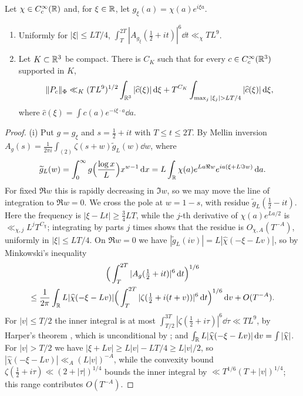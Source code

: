 \documentclass[11pt,colorlinks]{charlie}
\begin{document}
\begin{lemma}\label{lem:sixth}
Let $\chi\in C_c^\infty(\mathbb{R})$ and, for $\xi\in\mathbb{R}$, let $g_\xi(a)=\chi(a)e^{i\xi a}$.
\begin{enumerate}[label=(\roman*)]
\item Uniformly for $|\xi|\le LT/4$, $\int_{T}^{2T}|A_{g_\xi}(\frac12+it)|^6\dd t\ll_\chi TL^9$.
\item Let $K\subset\mathbb{R}^3$ be compact. There is $C_K$ such that for every $c\in C_c^\infty(\mathbb{R}^3)$ supported in $K$,
\[
 \|P_c\|_\Phi\ll_K(TL^9)^{1/2}\int_{\R^3}|\widehat c(\xi)|\dd\xi+T^{C_K}\int_{\max_j|\xi_j|>LT/4}|\widehat c(\xi)|\dd\xi ,
\]
where $\widehat c(\xi)=\int c(a)e^{-i\xi\cdot a}\dd a$.
\end{enumerate}
\end{lemma}
\begin{proof}
(i) Put $g=g_\xi$ and $s=\frac12+it$ with $T\le t\le2T$. By Mellin inversion $A_g(s)=\frac1{2\pi i}\int_{(2)}\zeta(s+w)\widetilde g_L(w)\dd w$, where
\[
 \widetilde g_L(w)=\int_0^\infty g\Big(\frac{\log x}L\Big)x^{w-1}\,\mathrm{d} x=L\int_{\mathbb{R}}\chi(a)e^{La\Re w}e^{ia(\xi+L\Im w)}\,\mathrm{d} a .
\]
For fixed $\Re w$ this is rapidly decreasing in $\Im w$, so we may move the line of integration to $\Re w=0$. We cross the pole at $w=1-s$, with residue $\widetilde g_L(\frac12-it)$. Here the frequency is $|\xi-Lt|\ge\frac34LT$, while the $j$-th derivative of $\chi(a)e^{La/2}$ is $\ll_{\chi,j}L^jT^{C_\chi}$; integrating by parts $j$ times shows that the residue is $O_{\chi,A}(T^{-A})$, uniformly in $|\xi|\le LT/4$. On $\Re w=0$ we have $|\widetilde g_L(iv)|=L|\widehat\chi(-\xi-Lv)|$, so by Minkowski's inequality
\begin{multline*}
 \Big(\int_T^{2T}|A_g(\tfrac12+it)|^6\,\mathrm{d} t\Big)^{1/6}\\
 \le\frac1{2\pi}\int_{\mathbb{R}} L|\widehat\chi(-\xi-Lv)|\Big(\int_T^{2T}|\zeta(\tfrac12+i(t+v))|^6\,\mathrm{d} t\Big)^{1/6}\,\mathrm{d} v+O(T^{-A}).
\end{multline*}
For $|v|\le T/2$ the inner integral is at most $\int_{T/2}^{3T}|\zeta(\frac12+i\tau)|^6\dd\tau\ll TL^9$, by Harper's theorem \cite{Harper}, which is unconditional by \cite{Alpoge}; and $\int_{\mathbb{R}} L|\widehat\chi(-\xi-Lv)|\,\mathrm{d} v=\int|\widehat\chi|$. For $|v|>T/2$ we have $|\xi+Lv|\ge L|v|-LT/4\ge L|v|/2$, so $|\widehat\chi(-\xi-Lv)|\ll_A(L|v|)^{-A}$, while the convexity bound $\zeta(\frac12+i\tau)\ll(2+|\tau|)^{1/4}$ bounds the inner integral by $\ll T^{1/6}(T+|v|)^{1/4}$; this range contributes $O(T^{-A})$.


\end{proof}
\end{document}

